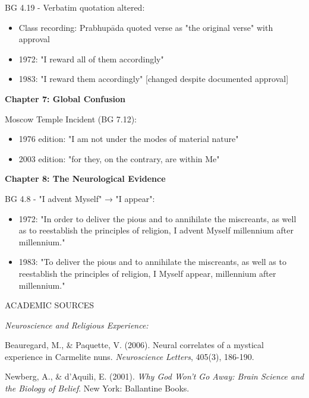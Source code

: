 \documentclass[12pt,twoside]{book}
\begin{document}
BG 4.19 - Verbatim quotation altered:
\begin{itemize}
\item Class recording: Prabhupāda quoted verse as "the original verse" with approval
\item 1972: "I reward all of them accordingly"
\item 1983: "I reward them accordingly" [changed despite documented approval]
\end{itemize}

\vspace{0.5cm}

\textbf{\textbf{Chapter 7: Global Confusion}}

Moscow Temple Incident (BG 7.12):
\begin{itemize}
\item 1976 edition: "I am not under the modes of material nature"
\item 2003 edition: "for they, on the contrary, are within Me"
\end{itemize}

\vspace{0.5cm}

\textbf{\textbf{Chapter 8: The Neurological Evidence}}

BG 4.8 - "I advent Myself" → "I appear":
\begin{itemize}
\item 1972: "In order to deliver the pious and to annihilate the miscreants, as well as to reestablish the principles of religion, I advent Myself millennium after millennium."
\item 1983: "To deliver the pious and to annihilate the miscreants, as well as to reestablish the principles of religion, I Myself appear, millennium after millennium."
\end{itemize}

\vspace{0.5cm}

ACADEMIC SOURCES

\vspace{0.1cm}

\emph{Neuroscience and Religious Experience:}

Beauregard, M., \& Paquette, V. (2006). Neural correlates of a mystical experience in Carmelite nuns. \emph{Neuroscience Letters}, 405(3), 186-190.

Newberg, A., \& d'Aquili, E. (2001). \emph{Why God Won't Go Away: Brain Science and the Biology of Belief}. New York: Ballantine Books.
\end{document}
